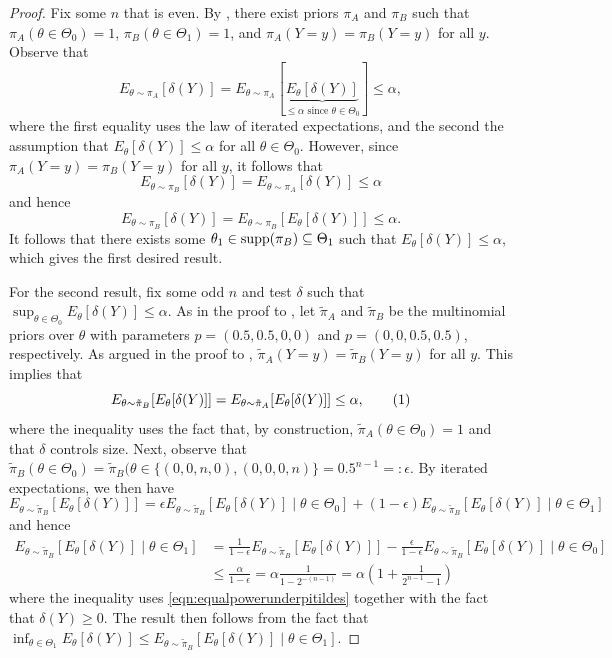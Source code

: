 \documentclass[12pt,reqno]{amsart}
\begin{document}
\prophasnopower*

\begin{proof}
Fix some $n$ that is even.
By , there exist priors $\pi_A$ and $\pi_B$ such that $\pi_A(\theta \in \Theta_0) = 1$, $\pi_B(\theta \in \Theta_1) = 1$, and $\pi_A(Y =y) = \pi_B(Y =y)$ for all $y$. Observe that
$$E_{\theta \sim \pi_A}[ \delta(Y) ] = E_{\theta \sim \pi_A}[ \underbrace{E_\theta[ \delta(Y) ]}_{\text{$\leq \alpha$ since $\theta \in \Theta_0$}} ] \leq \alpha,$$
\noindent where the first equality uses the law of iterated expectations, and the second the assumption that $E_\theta[\delta(Y)] \leq \alpha$ for all $\theta \in \Theta_0$. However, since $\pi_A(Y =y) = \pi_B(Y =y)$ for all $y$, it follows that 
$$E_{\theta \sim \pi_B}[\delta(Y)] = E_{\theta \sim \pi_A}[\delta(Y)] \leq \alpha$$
and hence
$$E_{\theta \sim \pi_B}[\delta(Y)] = E_{\theta \sim \pi_B}[ E_\theta[\delta(Y)] ] \leq \alpha.$$
\noindent It follows that there exists some $\theta_1 \in \operatorname{supp}(\pi_B) \subseteq \Theta_1$ such that $E_{\theta}[\delta(Y)] \leq \alpha$, which gives the first desired result. 

For the second result, fix some odd $n$ and test $\delta$ such that $\sup_{\theta \in \Theta_0} E_{\theta}[\delta(Y)] \leq \alpha$. As in the proof to , let $\tilde\pi_A$ and $\tilde\pi_B$ be the multinomial priors over $\theta$ with parameters $p=(0.5,0.5,0,0)$ and $p=(0,0,0.5,0.5)$, respectively. As argued in the proof to , $\tilde{\pi}_A(Y{=}y) = \tilde{\pi}_B(Y{=}y)$ for all $y$. This implies that
\[E_{\theta \sim \tilde{\pi}_B}[ E_{\theta}[\delta(Y)] ] = E_{\theta \sim \tilde{\pi}_A}[ E_{\theta}[\delta(Y)] ] \leq \alpha, \numberthis \label{eqn:equalpowerunderpitildes} \]
where the inequality uses the fact that, by construction, $\tilde{\pi}_A(\theta \in \Theta_0) = 1$ and that $\delta$ controls size. Next, observe that $\tilde\pi_B(\theta \in \Theta_0) = \tilde\pi_B( \theta \in \{(0,0,n,0),(0,0,0,n)\} = 0.5^{n-1} =: \epsilon$. By iterated expectations, we then have
\[ E_{\theta \sim \tilde{\pi}_B}[ E_{\theta}[\delta(Y)] ] = \epsilon E_{\theta \sim \tilde{\pi}_B}[ E_{\theta}[\delta(Y)] \mid \theta \in \Theta_0 ] + (1-\epsilon) E_{\theta \sim \tilde{\pi}_B}[ E_{\theta}[\delta(Y)] \mid \theta \in \Theta_1 ]  \]
and hence 
\begin{align*}
   E_{\theta \sim \tilde{\pi}_B}[ E_{\theta}[\delta(Y)] \mid \theta \in \Theta_1 ] &= \frac{1}{1-\epsilon} E_{\theta \sim \tilde{\pi}_B}[ E_{\theta}[\delta(Y)] ] - \frac{\epsilon}{1-\epsilon} E_{\theta \sim \tilde{\pi}_B}[ E_{\theta}[\delta(Y)] \mid \theta \in \Theta_0 ] \\
   &\leq \frac{\alpha}{1-\epsilon} = \alpha \frac{1}{1 - 2^{-(n-1)}} = \alpha \left(1 + \frac{1}{2^{n-1}-1} \right)
\end{align*}
where the inequality uses \eqref{eqn:equalpowerunderpitildes} together with the fact that $\delta(Y) \geq 0$. The result then follows from the fact that $\inf_{\theta \in \Theta_1} E_{\theta}[\delta(Y)] \leq E_{\theta \sim \tilde{\pi}_B}[ E_{\theta}[\delta(Y)] \mid \theta \in \Theta_1 ]$.
 \end{proof}
\end{document}
